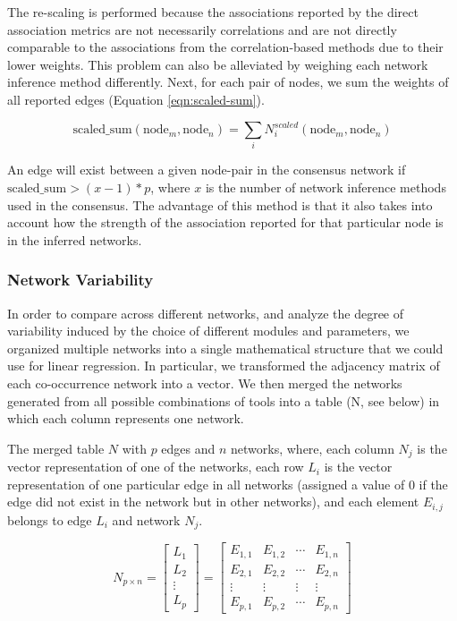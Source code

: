   The re-scaling is performed because the associations reported by the direct association metrics are not necessarily correlations and are not directly comparable to the associations from the correlation-based methods due to their lower weights. This problem can also be alleviated by weighing each network inference method differently. Next, for each pair of nodes, we sum the weights of all reported edges (Equation \ref{eqn:scaled-sum}).

  \begin{equation}
  \text{scaled\_sum}(\text{node}_{m}, \text{node}_{n}) = \sum_{i} N^{scaled}_{i}(\text{node}_{m}, \text{node}_{n})
  \label{eqn:scaled-sum}
  \end{equation}

  An edge will exist between a given node-pair in the consensus network if \(\text{scaled\_sum} > (x - 1) * p\), where \(x\) is the number of network inference methods used in the consensus. The advantage of this method is that it also takes into account how the strength of the association reported for that particular node is in the inferred networks.

  \subsubsection*{Network Variability}
  \vspace{-5mm}
 In order to compare across different networks, and analyze the degree of variability induced by the choice of different modules and parameters, we organized multiple networks into a single mathematical structure that we could use for linear regression.
 In particular, we transformed the adjacency matrix of each co-occurrence network into a vector.
 We then merged the networks generated from all possible combinations of tools into a table (N, see below) in which each column represents one network.

 The merged table $N$ with $p$ edges and $n$ networks, where, each column $N_j$ is the vector representation of one of the networks, each row $L_i$ is the vector representation of one particular edge in all networks (assigned a value of 0 if the edge did not exist in the network but in other networks), and each element $E_{i,j}$ belongs to edge $L_i$ and network $N_j$.

  \begin{equation*}
   N_{p \times n} =
   \begin{bmatrix}
     L_1 \\
     L_2 \\
     \vdots \\
     L_p
   \end{bmatrix}
   =
   \begin{bmatrix}
     E_{1,1} & E_{1,2} & \cdots  & E_{1, n} \\
     E_{2,1} & E_{2,2} & \cdots  & E_{2, n} \\
     \vdots & \vdots & \vdots  & \vdots \\
     E_{p,1} & E_{p,2} & \cdots  & E_{p, n}
   \end{bmatrix}
  \end{equation*}

